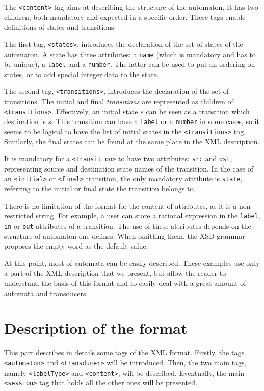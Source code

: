 \documentclass[a4paper]{article}
\newcommand{\xtag}[1]{\texttt{<#1>}}
\newcommand{\xattr}[1]{\texttt{#1}}
\def\typetag{\xtag{labelType}}
\def\contenttag{\xtag{content}}
\def\statestag{\xtag{states}}
\def\dstname{\xattr{dst}}
\def\srcname{\xattr{src}}
\def\transitionstag{\xtag{transitions}}
\def\transitiontag{\xtag{transition}}
\def\finaltag{\xtag{final}}
\def\initialtag{\xtag{initial}}
\def\sessiontag{\xtag{session}}
\def\automatontag{\xtag{automaton}}
\def\transducertag{\xtag{transducer}}
\def\nameattr{\xattr{name}}
\def\labelattr{\xattr{label}}
\def\inattr{\xattr{in}}
\def\outattr{\xattr{out}}
\def\numberattr{\xattr{number}}
\def\stateattr{\xattr{state}}
\begin{document}
The \contenttag{} tag aims at describing the structure of the
automaton. It has two children, both mandatory and expected
in a specific order. These tags enable definitions of states
and transitions.

The first tag, \statestag{}, introduces the declaration of
the set of states of the automaton. A state has three attributes: a
\nameattr{} (which is mandatory and has to be unique), a \labelattr{}
and a \numberattr{}. The latter can be used to put an ordering on states,
or to add special integer data to the state.

The second tag, \transitionstag{}, introduces the declaration
of the set of transitions. The initial and final
\textit{transitions} are represented as children of
\transitionstag{}. Effectively, an initial state $s$ can be seen as a transition
which destination is $s$. This transition can have a \labelattr{} or a
\numberattr{} in some cases, so it seems to be logical to have the list of
initial states in the \transitionstag{} tag.  Similarly, the final
states can be found at the same place in the XML description.

It is mandatory for a \transitiontag{} to have two attributes:
\srcname{} and \dstname{}, representing source and destination state
names of the
transition. In the case of an \initialtag{} or \finaltag{} transition,
the only mandatory attribute is \stateattr{}, referring to the initial
or final state the transition belongs to.

There is no limitation of the format for the content of attributes, as
it is a non-restricted string. For example, a user can store a
rational expression in the \labelattr{}, \inattr{} or \outattr{}
attributes of a transition. The use of these attributes depends on the
structure of automaton one defines. When omitting them, the XSD
grammar proposes the empty word as the default value.

At this point, most of automata can be easily described. These
examples use only a part of the XML description that we present, but
allow the reader to understand the basis of this format and to easily
deal with a great amount of automata and transducers.

\section{Description of the format}

This part describes in details some tags of the XML format.  Firstly,
the tags \automatontag{} and \transducertag{} will be introduced.
Then, the two main tags, namely \typetag{} and \contenttag{}, will be
described.  Eventually, the main \sessiontag{} tag that holds all the
other ones will be presented.
\end{document}
